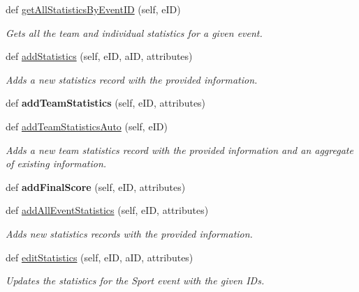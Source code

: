 \begin{DoxyCompactItemize}
def \hyperlink{classhandler_1_1event__result_1_1_event_result_handler_a0ab18f966bc1cb20c2efda7b917f6e31}{get\+All\+Statistics\+By\+Event\+ID} (self, e\+ID)
\begin{DoxyCompactList}\small\item\em Gets all the team and individual statistics for a given event. \end{DoxyCompactList}\item 
def \hyperlink{classhandler_1_1event__result_1_1_event_result_handler_a9301cbd74cac9840cb8a0a4a81aaf813}{add\+Statistics} (self, e\+ID, a\+ID, attributes)
\begin{DoxyCompactList}\small\item\em Adds a new statistics record with the provided information. \end{DoxyCompactList}\item 
\mbox{\label{classhandler_1_1event__result_1_1_event_result_handler_a44792c12d19fda979c8723d3bdc183db}} 
def {\bfseries add\+Team\+Statistics} (self, e\+ID, attributes)
\item 
def \hyperlink{classhandler_1_1event__result_1_1_event_result_handler_a583436934d6a30697d3f0df234460a15}{add\+Team\+Statistics\+Auto} (self, e\+ID)
\begin{DoxyCompactList}\small\item\em Adds a new team statistics record with the provided information and an aggregate of existing information. \end{DoxyCompactList}\item 
\mbox{\label{classhandler_1_1event__result_1_1_event_result_handler_a3423bb310b04fdebdb59c50482cbeec4}} 
def {\bfseries add\+Final\+Score} (self, e\+ID, attributes)
\item 
def \hyperlink{classhandler_1_1event__result_1_1_event_result_handler_aacc53c193c50a5e313257cc6b8e35adb}{add\+All\+Event\+Statistics} (self, e\+ID, attributes)
\begin{DoxyCompactList}\small\item\em Adds new statistics records with the provided information. \end{DoxyCompactList}\item 
def \hyperlink{classhandler_1_1event__result_1_1_event_result_handler_af2dd4f07340cb13d74ce942bca612389}{edit\+Statistics} (self, e\+ID, a\+ID, attributes)
\begin{DoxyCompactList}\small\item\em Updates the statistics for the Sport event with the given I\+Ds. \end{DoxyCompactList}\item 

\end{DoxyCompactItemize}
